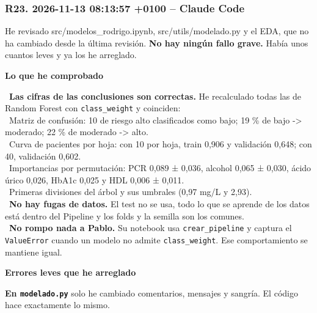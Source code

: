 \documentclass[11pt,a4paper]{article}
\begin{document}
\subsubsection*{R23. 2026-11-13 08:13:57 +0100 -- Claude Code}
{\small
He revisado src/\allowbreak{}modelos\_\allowbreak{}rodrigo.ipynb, src/\allowbreak{}utils/\allowbreak{}modelado.py y el EDA, que no ha cambiado desde la última revisión. \textbf{No hay ningún fallo grave.} Había unos cuantos leves y ya los he arreglado.

\smallskip\noindent\textbf{Lo que he comprobado}\par
\hspace*{1.0em}\textbullet~\textbf{Las cifras de las conclusiones son correctas.} He recalculado todas las de Random Forest con \texttt{class\_\allowbreak{}weight} y coinciden: \\{}
\hspace*{2.0em}\textbullet~Matriz de confusión: 10 de riesgo alto clasificados como bajo; 19 \% de bajo -\textgreater{} moderado; 22 \% de moderado -\textgreater{} alto. \\{}
\hspace*{2.0em}\textbullet~Curva de pacientes por hoja: con 10 por hoja, train 0,906 y validación 0,648; con 40, validación 0,602. \\{}
\hspace*{2.0em}\textbullet~Importancias por permutación: PCR 0,089 ± 0,036, alcohol 0,065 ± 0,030, ácido úrico 0,026, HbA1c 0,025 y HDL 0,006 ± 0,011. \\{}
\hspace*{2.0em}\textbullet~Primeras divisiones del árbol y sus umbrales (0,97 mg/\allowbreak{}L y 2,93). \\{}
\hspace*{1.0em}\textbullet~\textbf{No hay fugas de datos.} El test no se usa, todo lo que se aprende de los datos está dentro del Pipeline y los folds y la semilla son los comunes. \\{}
\hspace*{1.0em}\textbullet~\textbf{No rompo nada a Pablo.} Su notebook usa \texttt{crear\_\allowbreak{}pipeline} y captura el \texttt{ValueError} cuando un modelo no admite \texttt{class\_\allowbreak{}weight}. Ese comportamiento se mantiene igual.

\smallskip\noindent\textbf{Errores leves que he arreglado}\par
\textbf{En \texttt{modelado.py}} solo he cambiado comentarios, mensajes y sangría. El código hace exactamente lo mismo.

}
\end{document}
